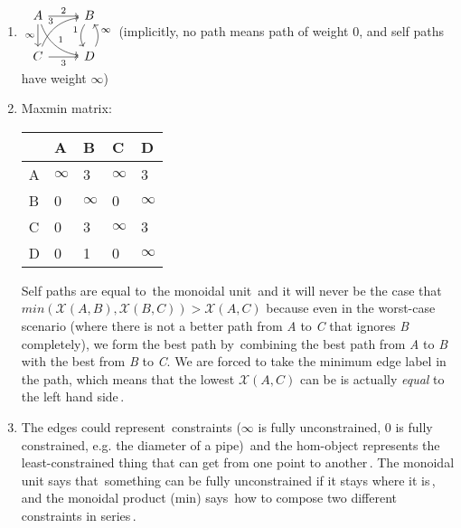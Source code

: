 \begin{enumerate}
    \item  $\begin{tikzcd}[ampersand replacement=\&]A \arrow[d, "\infty"'] \arrow[r, "2"] \arrow[rd, "1", bend right] \& B \arrow[d, "1"', bend right]      \\C \arrow[r, "3"'] \arrow[ru, "3", bend left]\& D \arrow[u, "\infty"', bend right]\end{tikzcd}$ (implicitly, no path means path of weight 0, and self paths have weight $\infty$)
    \item Maxmin matrix:

          \begin{minipage}{0.48\textwidth}
            \begin{tabular}{|l|l|l|l|l|}
              \hline
                & A        & B        & C        & D        \\ \hline
              A & $\infty$ & 3        & $\infty$ & 3        \\ \hline
              B & 0        & $\infty$ & 0        & $\infty$ \\ \hline
              C & 0        & 3        & $\infty$ & 3        \\  \hline
              D & 0        & 1        & 0        & $\infty$ \\ \hline
            \end{tabular}
          \end{minipage}

          Self paths are equal to \,the monoidal unit\, and it will never be the case that $min(\mathcal{X}(A,B),\mathcal{X}(B,C)) >  \mathcal{X}(A,C)$ because even in the worst-case scenario (where there is not a better path from \emph{A} to \emph{C} that ignores \emph{B} completely), we form the best path by \,combining the best path from \emph{A} to \emph{B} with the best from \emph{B} to \emph{C}. We are forced to take the minimum edge label in the path, which means that the lowest $\mathcal{X}(A,C)$ can be is actually \emph{equal} to the left hand side\,.
    \item The edges could represent \,constraints ($\infty$ is fully unconstrained, $0$ is fully constrained, e.g. the diameter of a pipe)\, and the hom-object represents the \,least-constrained thing that can get from one point to another\,. The monoidal unit says that \,something can be fully unconstrained if it stays where it is\,, and the monoidal product (min) says \,how to compose two different constraints in series\,.
  \end{enumerate}
